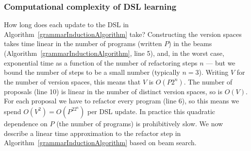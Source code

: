 \documentclass{article}
\begin{document}
\subsubsection{Computational complexity of DSL learning}

How long does each update to the DSL in
Algorithm~\ref{grammarInductionAlgorithm} take?  Constructing the
version spaces takes time linear in the number of programs (written
$P$) in the beams (Algorithm~\ref{grammarInductionAlgorithm}, line
5), and, in the worst case, exponential time as a function of the
number of refactoring steps $n$ --- but we bound the number of steps
to be a small number (typically $n = 3$).  Writing $V$ for the number
of version spaces, this means that $V$ is $O(P2^n)$.  The number of
proposals (line 10) is linear in the number of distinct version
spaces, so is $O(V)$.  For each proposal we have to refactor every
program (line 6), so this means we spend $O(V^2) = O(P^22^n)$ per DSL
update.  In practice this quadratic dependence on $P$ (the number of
programs) is prohibitively slow.  We now describe a linear time
approximation to the refactor step in
Algorithm~\ref{grammarInductionAlgorithm} based on beam search.
\end{document}
